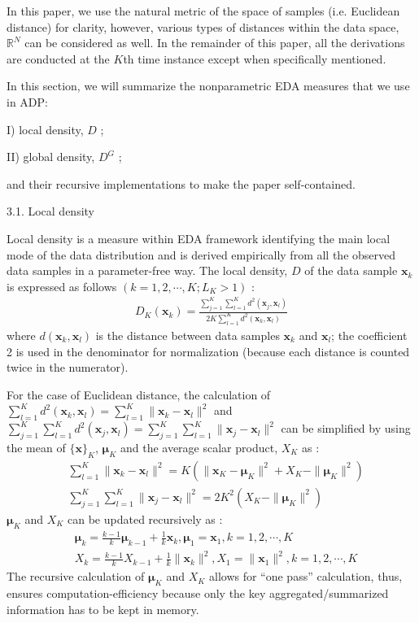 In this paper, we use the natural metric of the space of samples (i.e. Euclidean distance) for clarity, however, various types of distances within the data space, $\mathbb R^N$ can be considered as well. In the remainder of this paper, all the derivations are conducted at the $K$th time instance except when specifically mentioned.

In this section, we will summarize the nonparametric EDA measures that we use in ADP:

I) local density, $D$ \cite{Angelov2016-7844219,Angelov2017Empirical};

II) global density, $D^G$ \cite{Angelov2016-7844219,Angelov2017Empirical};

and their recursive implementations to make the paper self-contained.


3.1. Local density

Local density \cite{Angelov2016-7844219} is a measure within EDA framework identifying the main local mode of the data distribution and is derived empirically from all the observed data samples in a parameter-free way. The local density, $D$ of the data sample $\bm x_k$ is expressed as follows $(k = 1, 2, \cdots, K; L_K > 1)$ \cite{Angelov2016-7844219,Angelov2017Empirical}:
\begin{align}\label{EDAlocaldensity18072401}
    D_K(\bm x_k) =\frac{\sum^K_{j=1}\sum^K_{l=1} d^2(\bm x_j,\bm  x_l)} {2K \sum^K_{l=1} d^2(\bm x_k,\bm  x_l)}
\end{align}
where $d(\bm x_k, \bm x_l)$ is the distance between data samples $\bm x_k$ and $\bm x_l$; the coefficient 2 is used in the denominator for normalization (because each distance is counted twice in the numerator).

For the case of Euclidean distance, the calculation of $\sum^K_{l=1} d^2(\bm x_k,\bm  x_l)=\sum^K_{l=1}\|\bm x_k-\bm  x_l\|^2$ and $\sum^K_{j=1}\sum^K_{l=1} d^2(\bm x_j,\bm  x_l)=\sum^K_{j=1}\sum^K_{l=1}\|\bm x_j-\bm  x_l\|^2 $ can be simplified by using the mean of $\{\bm x\}_K$, $\bm \mu_K$ and the average scalar product, $X_K$ as \cite{Angelov2016-7844219,Angelov2017Empirical}:
\begin{align}
  &\sum^K_{l=1}\|\bm x_k-\bm  x_l\|^2=K(\|\bm x_K-\bm \mu_K\|^2+X_K-\|\bm \mu_K\|^2)\label{EDAlocaldensity18072402}\\
  &\sum^K_{j=1}\sum^K_{l=1}\|\bm x_j-\bm  x_l\|^2 =2K^2(X_K-\|\bm \mu_K\|^2)\label{EDAlocaldensity18072403}
\end{align}
$\bm \mu_K$ and $X_K$ can be updated recursively as \cite{Angelov2012Autonomous}:
\begin{align}
  &\bm \mu_k=\frac {k-1} k \bm \mu_{k-1}+\frac {1} k \bm  x_k, \bm \mu_1=\bm x_1, k=1,2,\cdots, K\label{EDAlocaldensity18072404}\\
  &X_k=\frac {k-1} k X_{k-1}+\frac {1} k \|\bm x_k\|^2, X_1=\|\bm  x_1\|^2, k=1,2,\cdots, K\label{EDAlocaldensity18072405}
\end{align}
The recursive calculation of $\bm \mu_K$ and $X_K$ allows for “one pass” calculation, thus, ensures computation-efficiency because only the key aggregated/summarized information has to be kept in memory.

